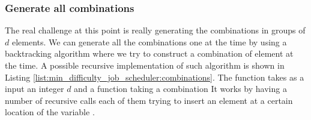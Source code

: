 \subsubsection{Generate all combinations}
The real challenge at this point is really generating the combinations in groups of $d$ elements. 
We can generate all the combinations one at the time by using a backtracking algorithm where we try to construct a combination of element at the time.
A possible recursive implementation of such algorithm is shown in Listing \ref{list:min_difficulty_job_scheduler:combinations}.
The function  takes as a input an integer $d$ and a function taking a combination
It works by having a number of recursive calls each of them trying to insert an element at a certain location of the variable .

\begin{minipage}{\linewidth}
	
\end{minipage}



